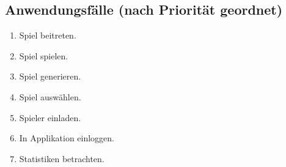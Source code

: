 \documentclass[11pt,ngerman]{article}
\begin{document}
    \subsection{Anwendungsfälle (nach Priorität geordnet)}
    \begin{enumerate}
        \item Spiel beitreten.
        \item Spiel spielen.
        \item Spiel generieren.
        \item Spiel auswählen.
        \item Spieler einladen.
        \item In Applikation einloggen.
        \item Statistiken betrachten.
    \end{enumerate}
\end{document}
